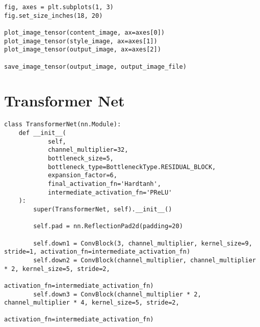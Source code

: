 \pagebreak

\begin{listing}[H]
\begin{verbatim}
fig, axes = plt.subplots(1, 3)
fig.set_size_inches(18, 20)

plot_image_tensor(content_image, ax=axes[0])
plot_image_tensor(style_image, ax=axes[1])
plot_image_tensor(output_image, ax=axes[2])

save_image_tensor(output_image, output_image_file)
\end{verbatim}
\label{lst:neural_style_transfer_6}
\end{listing}

\pagebreak


\section{Transformer Net}
\label{sec:transformer_net_full}

\begin{listing}[H]
\begin{verbatim}
class TransformerNet(nn.Module):
    def __init__(
            self,
            channel_multiplier=32,
            bottleneck_size=5,
            bottleneck_type=BottleneckType.RESIDUAL_BLOCK,
            expansion_factor=6,
            final_activation_fn='Hardtanh',
            intermediate_activation_fn='PReLU'
    ):
        super(TransformerNet, self).__init__()

        self.pad = nn.ReflectionPad2d(padding=20)

        self.down1 = ConvBlock(3, channel_multiplier, kernel_size=9, stride=1, activation_fn=intermediate_activation_fn)
        self.down2 = ConvBlock(channel_multiplier, channel_multiplier * 2, kernel_size=5, stride=2,
                               activation_fn=intermediate_activation_fn)
        self.down3 = ConvBlock(channel_multiplier * 2, channel_multiplier * 4, kernel_size=5, stride=2,
                               activation_fn=intermediate_activation_fn)
\end{verbatim}
\label{lst:transformer_net_full_1}
\end{listing}

\pagebreak

